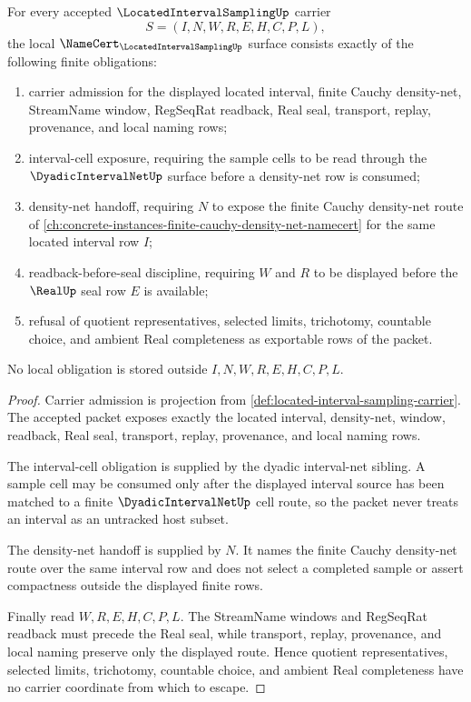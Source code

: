 \begin{theorem}
\label{thm:located-interval-sampling-namecert-obligations}
For every accepted $\LocatedIntervalSamplingUp$ carrier
$$
S=(I,N,W,R,E,H,C,P,L),
$$
the local $\NameCert_{\LocatedIntervalSamplingUp}$ surface consists exactly of the following finite obligations:
\begin{enumerate}
\item carrier admission for the displayed located interval, finite Cauchy density-net, StreamName window, RegSeqRat readback, Real seal, transport, replay, provenance, and local naming rows;
\item interval-cell exposure, requiring the sample cells to be read through the $\DyadicIntervalNetUp$ surface before a density-net row is consumed;
\item density-net handoff, requiring $N$ to expose the finite Cauchy density-net route of \autoref{ch:concrete-instances-finite-cauchy-density-net-namecert} for the same located interval row $I$;
\item readback-before-seal discipline, requiring $W$ and $R$ to be displayed before the $\RealUp$ seal row $E$ is available;
\item refusal of quotient representatives, selected limits, trichotomy, countable choice, and ambient Real completeness as exportable rows of the packet.
\end{enumerate}
No local obligation is stored outside $I,N,W,R,E,H,C,P,L$.
\end{theorem}
\begin{proof}
Carrier admission is projection from \autoref{def:located-interval-sampling-carrier}. The accepted packet exposes exactly the located interval, density-net, window, readback, Real seal, transport, replay, provenance, and local naming rows.

The interval-cell obligation is supplied by the dyadic interval-net sibling. A sample cell may be consumed only after the displayed interval source has been matched to a finite $\DyadicIntervalNetUp$ cell route, so the packet never treats an interval as an untracked host subset.

The density-net handoff is supplied by $N$. It names the finite Cauchy density-net route over the same interval row and does not select a completed sample or assert compactness outside the displayed finite rows.

Finally read $W,R,E,H,C,P,L$. The StreamName windows and RegSeqRat readback must precede the Real seal, while transport, replay, provenance, and local naming preserve only the displayed route. Hence quotient representatives, selected limits, trichotomy, countable choice, and ambient Real completeness have no carrier coordinate from which to escape.
\end{proof}

